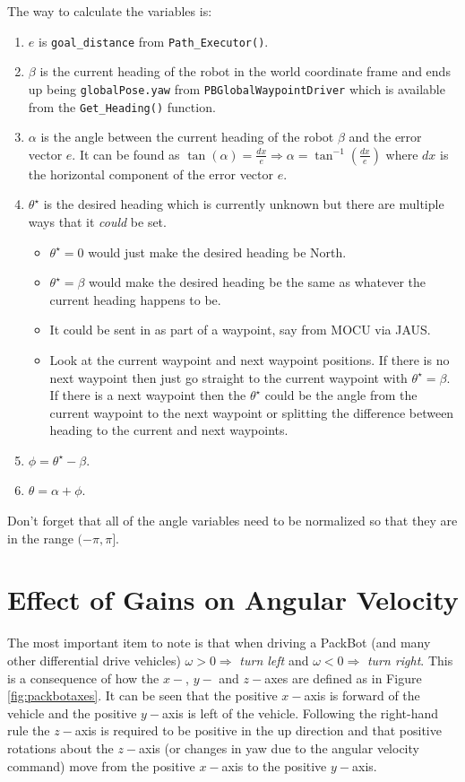 \documentclass[12pt]{article}
\begin{document}
The way to calculate the variables is:
\begin{enumerate}
\item $e$ is \texttt{goal\_distance} from \texttt{Path\_Executor()}.
\item $\beta$ is the current heading of the robot in the world coordinate frame and ends up being \texttt{globalPose.yaw} from \texttt{PBGlobalWaypointDriver} which is available from the \texttt{Get\_Heading()} function.
\item $\alpha$ is the angle between the current heading of the robot $\beta$ and the error vector $e$. It can be found as $\tan(\alpha) = \frac{dx}{e} \Rightarrow \alpha = \tan^{-1}\left(\frac{dx}{e}\right)$ where $dx$ is the horizontal component of the error vector $e$.
\item $\theta^\star$ is the desired heading which is currently unknown but there are multiple ways that it \textit{could} be set.
\begin{itemize}
\item $\theta^\star=0$ would just make the desired heading be North.
\item $\theta^\star=\beta$ would make the desired heading be the same as whatever the current heading happens to be.
\item It could be sent in as part of a waypoint, say from MOCU via JAUS.
\item Look at the current waypoint and next waypoint positions. If there is no next waypoint then just go straight to the current waypoint with $\theta^\star=\beta$. If there is a next waypoint then the $\theta^\star$ could be the angle from the current waypoint to the next waypoint or splitting the difference between heading to the current and next waypoints.
\end{itemize}
\item $\phi=\theta^\star-\beta$.
\item $\theta=\alpha + \phi$.
\end{enumerate}
Don't forget that all of the angle variables need to be normalized so that they are in the range $(-\pi,\pi]$.

\section{Effect of Gains on Angular Velocity}
The most important item to note is that when driving a PackBot (and many other differential drive vehicles) $\omega>0\Rightarrow$ \textit{turn left} and $\omega<0\Rightarrow$ \textit{turn right}. This is a consequence of how the $x-$, $y-$ and $z-$axes are defined as in Figure \ref{fig:packbotaxes}. It can be seen that the positive $x-$axis is forward of the vehicle and the positive $y-$axis is left of the vehicle. Following the right-hand rule the $z-$axis is required to be positive in the up direction and that positive rotations about the $z-$axis (or changes in yaw due to the angular velocity command) move from the positive $x-$axis to the positive $y-$axis.
\end{document}
